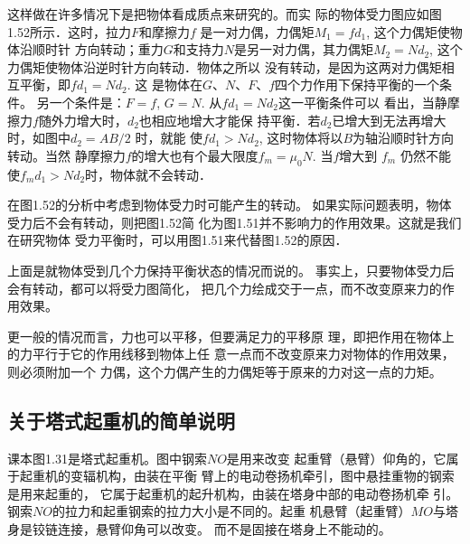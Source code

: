 这样做在许多情况下是把物体看成质点来研究的。而实
际的物体受力图应如图1.52所示．这时，拉力$F$和摩擦力$f$
是一对力偶，力偶矩$M_1=fd_1$, 这个力偶矩使物体沿顺时针
方向转动；重力$G$和支持力$N$是另一对力偶，其力偶矩$M_2
=Nd_2$, 这个力偶矩使物体沿逆时针方向转动．物体之所以
没有转动，是因为这两对力偶矩相互平衡，即$fd_1=Nd_2$. 这
是物体在$G$、$N$、$F$、$f$四个力作用下保持平衡的一个条件。
另一个条件是：$F=f$, $G=N$. 从$fd_1=Nd_2$这一平衡条件可以
看出，当静摩擦力$f$随外力增大时，$d_2$也相应地增大才能保
持平衡．若$d_2$已增大到无法再增大时，如图中$d_2=AB/2$
时，就能
使$fd_1>Nd_2$, 这时物体将以$B$为轴沿顺时针方向转动。当然
静摩擦力$f$的增大也有个最大限度$f_m=\mu_0 N$. 当$f$增大到
$f_m$ 仍然不能使$f_md_1>Nd_2$时，物体就不会转动．

在图1.52的分析中考虑到物体受力时可能产生的转动。
如果实际问题表明，物体受力后不会有转动，则把图1.52简
化为图1.51并不影响力的作用效果。这就是我们在研究物体
受力平衡时，可以用图1.51来代替图1.52的原因．

上面是就物体受到几个力保持平衡状态的情况而说的。
事实上，只要物体受力后会有转动，都可以将受力图简化，
把几个力绘成交于一点，而不改变原来力的作用效果。

更一般的情况而言，力也可以平移，但要满足力的平移原
理，即把作用在物体上的力平行于它的作用线移到物体上任
意一点而不改变原来力对物体的作用效果，则必须附加一个
力偶，这个力偶产生的力偶矩等于原来的力对这一点的力矩。

\subsection{关于塔式起重机的简单说明}

课本图1.31是塔式起重机。图中钢索$NO$是用来改变
起重臂（悬臂）仰角的，它属于起重机的变辐机构，由装在平衡
臂上的电动卷扬机牵引，图中悬挂重物的钢索是用来起重的，
它属于起重机的起升机构，由装在塔身中部的电动卷扬机牵
引。钢索$NO$的拉力和起重钢索的拉力大小是不同的。起重
机悬臂（起重臂）$MO$与塔身是铰链连接，悬臂仰角可以改变。
而不是固接在塔身上不能动的。


